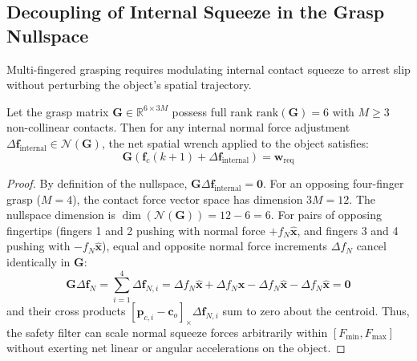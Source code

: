 \subsection{Decoupling of Internal Squeeze in the Grasp Nullspace}
Multi-fingered grasping requires modulating internal contact squeeze to arrest slip without perturbing the object's spatial trajectory.

\begin{theorem}
\label{thm:nullspace}
Let the grasp matrix $\mathbf{G} \in \mathbb{R}^{6 \times 3M}$ possess full rank $\text{rank}(\mathbf{G}) = 6$ with $M \ge 3$ non-collinear contacts. Then for any internal normal force adjustment $\Delta \mathbf{f}_{\text{internal}} \in \mathcal{N}(\mathbf{G})$, the net spatial wrench applied to the object satisfies:
\begin{equation}
    \mathbf{G} \left( \mathbf{f}_c(k+1) + \Delta \mathbf{f}_{\text{internal}} \right) = \mathbf{w}_{\text{req}}
\end{equation}
\end{theorem}
\begin{proof}
By definition of the nullspace, $\mathbf{G} \Delta \mathbf{f}_{\text{internal}} = \mathbf{0}$. For an opposing four-finger grasp ($M = 4$), the contact force vector space has dimension $3M = 12$. The nullspace dimension is $\dim(\mathcal{N}(\mathbf{G})) = 12 - 6 = 6$. For pairs of opposing fingertips (fingers 1 and 2 pushing with normal force $+f_N \hat{\mathbf{x}}$, and fingers 3 and 4 pushing with $-f_N \hat{\mathbf{x}}$), equal and opposite normal force increments $\Delta f_N$ cancel identically in $\mathbf{G}$:
\begin{equation}
    \mathbf{G} \Delta \mathbf{f}_N = \sum_{i=1}^4 \Delta \mathbf{f}_{N, i} = \Delta f_N \hat{\mathbf{x}} + \Delta f_N \hat{\mathbf{x}} - \Delta f_N \hat{\mathbf{x}} - \Delta f_N \hat{\mathbf{x}} = \mathbf{0}
\end{equation}
and their cross products $[\mathbf{p}_{c, i} - \mathbf{c}_o]_\times \Delta \mathbf{f}_{N, i}$ sum to zero about the centroid. Thus, the safety filter can scale normal squeeze forces arbitrarily within $[F_{\min}, F_{\max}]$ without exerting net linear or angular accelerations on the object.
\end{proof}

